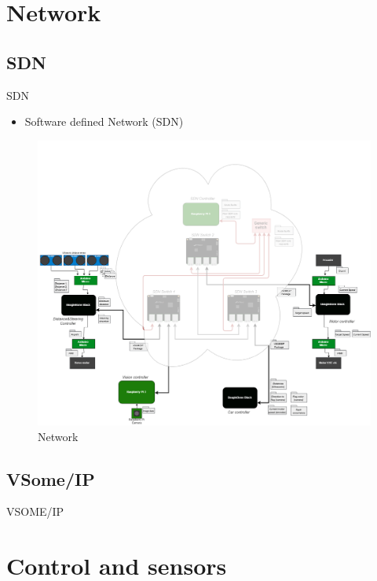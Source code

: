 \documentclass{beamer}
\begin{document}

\section{Network}
\subsection{SDN}
\begin{frame}{SDN}
    \begin{itemize}
        \item Software defined Network (SDN)
    \end{itemize}
    \begin{figure}
        \includegraphics[width=0.6\linewidth]{network.png}
        \caption{Network}
    \end{figure}
\end{frame}
\subsection{VSome/IP}
\begin{frame}{VSOME/IP}
    
\end{frame}


\section{Control and sensors }
\end{document}
